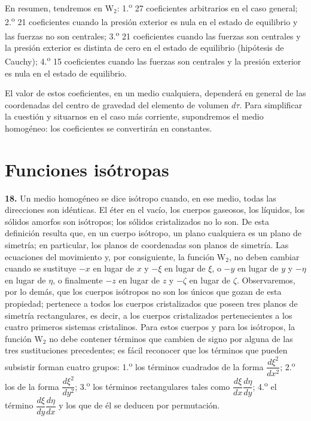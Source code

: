 En resumen, tendremos en $\mathrm{W}_2$: 1.\textsuperscript{o} 27
coeficientes arbitrarios en el caso general; 2.\textsuperscript{o} 21
coeficientes cuando la presión exterior es nula en el estado de equilibrio
y las fuerzas no son centrales; 3.\textsuperscript{o} 21 coeficientes
cuando las fuerzas son centrales y la presión exterior es distinta de cero
en el estado de equilibrio (hipótesis de Cauchy); 4.\textsuperscript{o} 15
coeficientes cuando las fuerzas son centrales y la presión exterior es
nula en el estado de equilibrio.

El valor de estos coeficientes, en un medio cualquiera, dependerá en
general de las coordenadas del centro de gravedad del elemento de volumen
$d\tau$. Para simplificar la cuestión y situarnos en el caso más corriente,
supondremos el medio homogéneo: los coeficientes se convertirán en
constantes.

\section{Funciones isótropas}

\noindent\textbf{18.} Un medio homogéneo se dice isótropo cuando, en ese
medio, todas las direcciones son idénticas. El éter en el vacío, los
cuerpos gaseosos, los líquidos, los sólidos amorfos son isótropos; los
sólidos cristalizados no lo son. De esta definición resulta que, en un
cuerpo isótropo, un plano cualquiera es un plano de simetría; en
particular, los planos de coordenadas son planos de simetría. Las
ecuaciones del movimiento y, por consiguiente, la función $\mathrm{W}_2$,
no deben cambiar cuando se sustituye $-x$ en lugar de $x$ y $-\xi$ en
lugar de $\xi$, o $-y$ en lugar de $y$ y $-\eta$ en lugar de $\eta$, o
finalmente $-z$ en lugar de $z$ y $-\zeta$ en lugar de $\zeta$.
Observaremos, por lo demás, que los cuerpos isótropos no son los únicos
que gozan de esta propiedad; pertenece a todos los cuerpos cristalizados
que poseen tres planos de simetría rectangulares, es decir, a los cuerpos
cristalizados pertenecientes a los cuatro primeros sistemas cristalinos.
Para estos cuerpos y para los isótropos, la función $\mathrm{W}_2$ no debe
contener términos que cambien de signo por alguna de las tres sustituciones
precedentes; es fácil reconocer que los términos que pueden subsistir
forman cuatro grupos: 1.\textsuperscript{o} los términos cuadrados de la
forma $\dfrac{d\xi^2}{dx^2}$; 2.\textsuperscript{o} los de la forma $\dfrac{d\xi^2}{dy^2}$;
3.\textsuperscript{o} los términos rectangulares tales como
$\dfrac{d\xi}{dx}\dfrac{d\eta}{dy}$; 4.\textsuperscript{o} el término
$\dfrac{d\xi}{dy}\dfrac{d\eta}{dx}$ y los que de él se deducen por
permutación.

